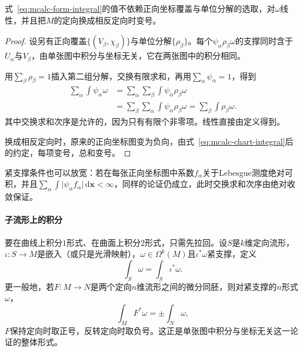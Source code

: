 \begin{theorem}[形式积分的良定性]
\label{thm:mcalc-form-integral-welldefined}
式~\eqref{eq:mcalc-form-integral}的值不依赖正向坐标覆盖与单位分解的选取，对$\omega$线性，并且把$M$的定向换成相反定向时变号。
\end{theorem}

\begin{proof}
设另有正向覆盖$\{(V_\beta,\chi_\beta)\}$与单位分解$\{\rho_\beta\}$。每个$\psi_\alpha\rho_\beta\omega$的支撑同时含于$U_\alpha$与$V_\beta$，由单张图中积分与坐标无关，它在两张图中的积分相同。

用$\sum_\beta\rho_\beta=1$插入第二组分解，交换有限求和，再用$\sum_\alpha\psi_\alpha=1$，得到
\[
\begin{aligned}
\sum_\alpha\int\psi_\alpha\omega&=\sum_\alpha\sum_\beta\int\psi_\alpha\rho_\beta\omega\\
&=\sum_\beta\sum_\alpha\int\psi_\alpha\rho_\beta\omega=\sum_\beta\int\rho_\beta\omega .
\end{aligned}
\]
其中交换求和次序是允许的，因为只有有限个非零项。线性直接由定义得到。

换成相反定向时，原来的正向坐标图变为负向，由式~\eqref{eq:mcalc-chart-integral}后的约定，每项变号，总和变号。
\end{proof}

紧支撑条件也可以放宽：若在每张正向坐标图中系数$f_\alpha$关于Lebesgue测度绝对可积，并且$\sum_\alpha\int\lvert\psi_\alpha f_\alpha\rvert\,\mathrm d\bm x<\infty$，同样的论证仍成立，此时交换求和次序由绝对收敛保证。

\paragraph{子流形上的积分}
要在曲线上积分$1$形式、在曲面上积分$2$形式，只需先拉回。设$S$是$k$维定向流形，$\iota:S\to M$是嵌入（或只是光滑映射），$\omega\in\Omega^k(M)$且$\iota^*\omega$紧支撑，定义
\begin{equation}
\int_S\omega=\int_S\iota^*\omega .
\label{eq:mcalc-submanifold-integral}
\end{equation}
更一般地，若$F:M\to N$是两个定向$n$维流形之间的微分同胚，则对紧支撑的$n$形式$\omega$，
\begin{equation}
\int_MF^*\omega=\pm\int_N\omega ,
\label{eq:mcalc-diffeo-integral}
\end{equation}
$F$保持定向时取正号，反转定向时取负号。这正是单张图中积分与坐标无关这一论证的整体形式。

